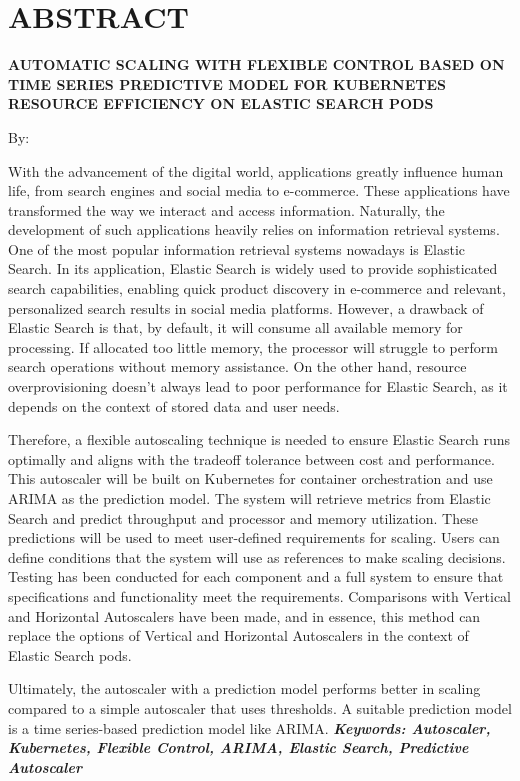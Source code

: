 \clearpage
\chapter*{ABSTRACT}

\begin{center}
    \center
    \begin{singlespace}
      \large\bfseries\MakeUppercase{Automatic Scaling with Flexible Control Based on Time Series Predictive Model for Kubernetes Resource Efficiency on Elastic Search Pods}
  
      \normalfont\normalsize
      By:
  
      \bfseries \theauthor
    \end{singlespace}
\end{center} 


\begin{singlespace}
    \small
    With the advancement of the digital world, applications greatly influence human life, from search engines and social media to e-commerce. These applications have transformed the way we interact and access information. Naturally, the development of such applications heavily relies on information retrieval systems. One of the most popular information retrieval systems nowadays is Elastic Search. In its application, Elastic Search is widely used to provide sophisticated search capabilities, enabling quick product discovery in e-commerce and relevant, personalized search results in social media platforms. However, a drawback of Elastic Search is that, by default, it will consume all available memory for processing. If allocated too little memory, the processor will struggle to perform search operations without memory assistance. On the other hand, resource overprovisioning doesn't always lead to poor performance for Elastic Search, as it depends on the context of stored data and user needs.

    Therefore, a flexible autoscaling technique is needed to ensure Elastic Search runs optimally and aligns with the tradeoff tolerance between cost and performance. This autoscaler will be built on Kubernetes for container orchestration and use ARIMA as the prediction model. The system will retrieve metrics from Elastic Search and predict throughput and processor and memory utilization. These predictions will be used to meet user-defined requirements for scaling. Users can define conditions that the system will use as references to make scaling decisions. Testing has been conducted for each component and a full system to ensure that specifications and functionality meet the requirements. Comparisons with Vertical and Horizontal Autoscalers have been made, and in essence, this method can replace the options of Vertical and Horizontal Autoscalers in the context of Elastic Search pods.

    Ultimately, the autoscaler with a prediction model performs better in scaling compared to a simple autoscaler that uses thresholds. A suitable prediction model is a time series-based prediction model like ARIMA.
    \textbf{\textit{Keywords: Autoscaler, Kubernetes, Flexible Control, ARIMA, Elastic Search, Predictive Autoscaler}}
\end{singlespace}
\clearpage

\clearpage